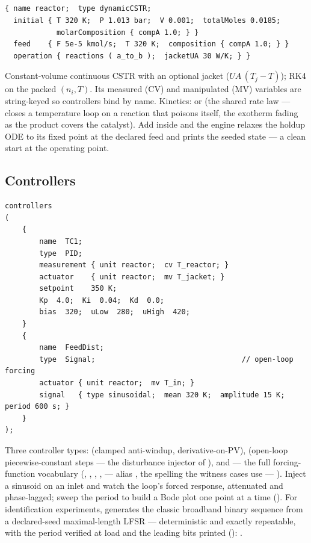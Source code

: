 \documentclass[11pt,a4paper]{article}
\begin{document}
\subsection{}

\begin{lstlisting}[language=dict]
{ name reactor;  type dynamicCSTR;
  initial { T 320 K;  P 1.013 bar;  V 0.001;  totalMoles 0.0185;
            molarComposition { compA 1.0; } }
  feed    { F 5e-5 kmol/s;  T 320 K;  composition { compA 1.0; } }
  operation { reactions ( a_to_b );  jacketUA 30 W/K; } }
\end{lstlisting}

Constant-volume continuous CSTR with an optional jacket
($UA\,(T_j - T)$); RK4 on the packed $(n_i, T)$.  Its measured (CV)
and manipulated (MV) variables are string-keyed so controllers bind by
name.  Kinetics:  or  (the shared rate law
---  closes a temperature loop on a
reaction that poisons itself, the exotherm fading as the product covers
the catalyst).  Add  inside 
and the engine relaxes the holdup ODE to its fixed point at the
declared feed and prints the seeded state --- a clean start at the
operating point.

\subsection{Controllers}

\begin{lstlisting}[language=dict]
controllers
(
    {
        name  TC1;
        type  PID;
        measurement { unit reactor;  cv T_reactor; }
        actuator    { unit reactor;  mv T_jacket; }
        setpoint    350 K;
        Kp  4.0;  Ki  0.04;  Kd  0.0;
        bias  320;  uLow  280;  uHigh  420;
    }
    {
        name  FeedDist;
        type  Signal;                                  // open-loop forcing
        actuator { unit reactor;  mv T_in; }
        signal   { type sinusoidal;  mean 320 K;  amplitude 15 K;  period 600 s; }
    }
);
\end{lstlisting}

Three controller types:  (clamped anti-windup,
derivative-on-PV),  (open-loop piecewise-constant steps
--- the disturbance injector of ),
and  --- the full forcing-function vocabulary
(, , , ,
 --- alias , the spelling the witness cases use ---
).  Inject a sinusoid on an inlet and watch the
loop's forced response, attenuated and phase-lagged; sweep the period to
build a Bode plot one point at a time ().
For identification experiments,  generates the classic
broadband binary sequence from a declared-seed maximal-length LFSR ---
deterministic and exactly repeatable, with the period verified at load
and the leading bits printed ():
.
\end{document}
